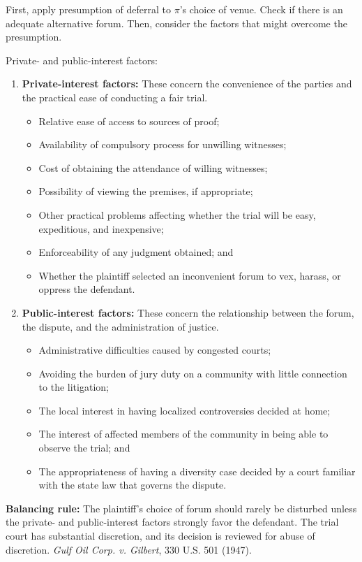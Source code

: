 \documentclass[11pt]{tex/lawoutline}
\begin{document}
{
First, apply presumption of deferral to $\pi$'s choice of venue. Check if there is an adequate alternative forum. Then, consider the factors that might overcome the presumption. 

Private- and public-interest factors:

\begin{enumerate}
    \item \textbf{Private-interest factors:} These concern the convenience of the parties and the practical ease of conducting a fair trial.
    \begin{itemize}
        \item Relative ease of access to sources of proof;
        \item Availability of compulsory process for unwilling witnesses;
        \item Cost of obtaining the attendance of willing witnesses;
        \item Possibility of viewing the premises, if appropriate;
        \item Other practical problems affecting whether the trial will be easy, expeditious, and inexpensive;
        \item Enforceability of any judgment obtained; and
        \item Whether the plaintiff selected an inconvenient forum to vex, harass, or oppress the defendant.
    \end{itemize}

    \item \textbf{Public-interest factors:} These concern the relationship between the forum, the dispute, and the administration of justice.
    \begin{itemize}
        \item Administrative difficulties caused by congested courts;
        \item Avoiding the burden of jury duty on a community with little connection to the litigation;
        \item The local interest in having localized controversies decided at home;
        \item The interest of affected members of the community in being able to observe the trial; and
        \item The appropriateness of having a diversity case decided by a court familiar with the state law that governs the dispute.
    \end{itemize}
\end{enumerate}

\textbf{Balancing rule:} The plaintiff's choice of forum should rarely be disturbed unless the private- and public-interest factors strongly favor the defendant. The trial court has substantial discretion, and its decision is reviewed for abuse of discretion. \textit{Gulf Oil Corp. v. Gilbert}, 330 U.S. 501 (1947).
}
\end{document}
